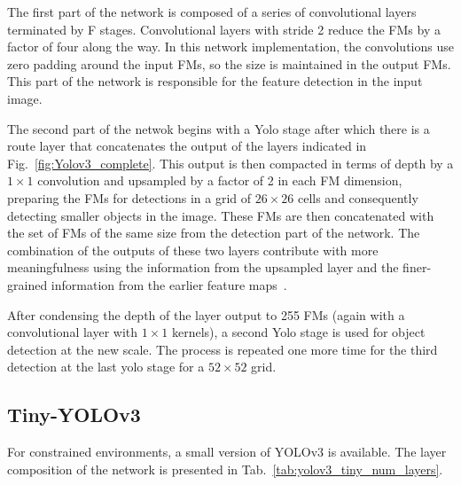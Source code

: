 The first part of the network is composed of a series of convolutional layers
terminated by F stages. Convolutional layers with stride 2 reduce the FMs by a
factor of four along the way. In this network implementation, the convolutions
use zero padding around the input FMs, so the size is maintained in the output
FMs. This part of the network is responsible for the feature detection in the
input image.

The second part of the netwok begins with a Yolo stage after which there is a
route layer that concatenates the output of the layers indicated in
Fig.~\ref{fig:Yolov3_complete}. This output is then compacted in terms of depth
by a $1\times 1$ convolution and upsampled by a factor of 2 in each FM
dimension, preparing the FMs for detections in a grid of $26\times26$ cells and
consequently detecting smaller objects in the image. These FMs are then
concatenated with the set of FMs of the same size from the detection part of the
network. The combination of the outputs of these two layers contribute with more
meaningfulness using the information from the upsampled layer and the
finer-grained information from the earlier feature maps~\cite{yolov3}.

After condensing the depth of the layer output to 255 FMs (again with a
convolutional layer with $1\times 1$ kernels), a second Yolo stage is used for
object detection at the new scale. The process is repeated one more time for the
third detection at the last yolo stage for a $52\times52$ grid.


\subsection{Tiny-YOLOv3}
\label{sec:tiny-yolov3}
For constrained environments, a small version of YOLOv3 is available. The layer
composition of the network is presented in
Tab.~\ref{tab:yolov3_tiny_num_layers}.


